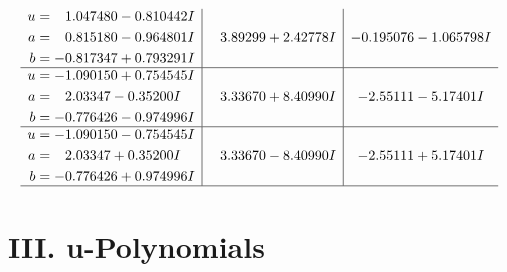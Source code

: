 \documentclass[1p]{elsarticle_modified}
\theoremstyle{definition}
\begin{document}
$$\begin{array}{c|c|c}
\begin{aligned}
u &= \phantom{-}1.047480 - 0.810442 I \\
a &= \phantom{-}0.815180 - 0.964801 I \\
b &= -0.817347 + 0.793291 I\end{aligned}
 & \phantom{-}3.89299 + 2.42778 I & -0.195076 - 1.065798 I \\ \hline\begin{aligned}
u &= -1.090150 + 0.754545 I \\
a &= \phantom{-}2.03347 - 0.35200 I \\
b &= -0.776426 - 0.974996 I\end{aligned}
 & \phantom{-}3.33670 + 8.40990 I & -2.55111 - 5.17401 I \\ \hline\begin{aligned}
u &= -1.090150 - 0.754545 I \\
a &= \phantom{-}2.03347 + 0.35200 I \\
b &= -0.776426 + 0.974996 I\end{aligned}
 & \phantom{-}3.33670 - 8.40990 I & -2.55111 + 5.17401 I\\
 \hline 
 \end{array}$$\newpage
\newpage\renewcommand{\arraystretch}{1}
\centering \section*{ III. u-Polynomials}
\end{document}
